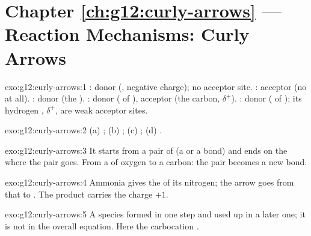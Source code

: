 \section*{Chapter \ref{ch:g12:curly-arrows} --- Reaction Mechanisms: Curly Arrows}

\begin{solution}{exo:g12:curly-arrows:1}
: donor (, negative charge); no acceptor site.
: acceptor (no  at all). : donor (the ). : donor ( of ), acceptor (the carbon,
$\delta^+$). : donor ( of ); its hydrogen ,
$\delta^+$, are weak acceptor sites.
\end{solution}

\begin{solution}{exo:g12:curly-arrows:2}
(a) ; (b) ; (c) ; (d) .
\end{solution}

\begin{solution}{exo:g12:curly-arrows:3}
It starts from a pair of  (a  or a bond) and ends on
the  where the pair goes. From a  of oxygen to a carbon: the
pair becomes a new  bond.
\end{solution}

\begin{solution}{exo:g12:curly-arrows:4}
Ammonia gives the  of its nitrogen; the arrow goes from that
 to . The product  carries the charge $+1$.
\end{solution}

\begin{solution}{exo:g12:curly-arrows:5}
A species formed in one step and used up in a later one; it is not in
the overall equation. Here the carbocation .
\end{solution}

